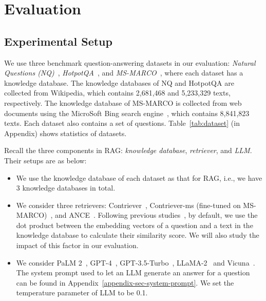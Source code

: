 \section{Evaluation}
\label{sec:exp}



\vspace{-2mm}
\subsection{Experimental Setup}
\label{exp:setup-exp}
\vspace{-2mm}
We use three benchmark question-answering datasets in our evaluation: \emph{Natural Questions (NQ)}~\cite{kwiatkowski2019natural}, \emph{HotpotQA}~\cite{yang2018hotpotqa}, and \emph{MS-MARCO}~\cite{nguyen2016ms}, where each dataset has a knowledge database. The knowledge databases of NQ and HotpotQA are collected from Wikipedia, which contains 2,681,468 and 5,233,329 texts, respectively. The knowledge database of MS-MARCO is collected from web documents using the MicroSoft Bing search engine~\cite{bing-msmarco}, which contains 8,841,823 texts. Each dataset also contains a set of questions. Table~\ref{tab:dataset} (in Appendix) shows statistics of datasets. 



 Recall the 
three components in RAG: \emph{knowledge database}, \emph{retriever}, and \emph{LLM}. Their setups are as below:
\begin{itemize}
    \vspace{-2mm}
    \item {}We use the knowledge database of each dataset as that for RAG, i.e., we have 3 knowledge databases in total.
    \vspace{-2mm}
    \item {}We consider three retrievers: Contriever~\cite{izacard2022unsupervised}, Contriever-ms (fine-tuned on MS-MARCO)~\cite{izacard2022unsupervised}, and ANCE~\cite{xiong2021approximate}. Following previous studies~\cite{zhong2023poisoning, lewis2020retrieval}, by default, we use the dot product between the embedding vectors of a question and a text in the knowledge database to calculate their similarity score. We will also study the impact of this factor in our evaluation. 
    \vspace{-2mm}
    \item {} We consider PaLM 2~\cite{anil2023palm}, GPT-4~\cite{achiam2023gpt}, GPT-3.5-Turbo~\cite{brown2020language}, LLaMA-2~\cite{touvron2023llama} and Vicuna~\cite{vicuna2023}. The system prompt used to let an LLM generate an answer for a question can be found in Appendix~\ref{appendix-sec-system-prompt}. We set the temperature parameter of LLM to be 0.1.
\end{itemize}




